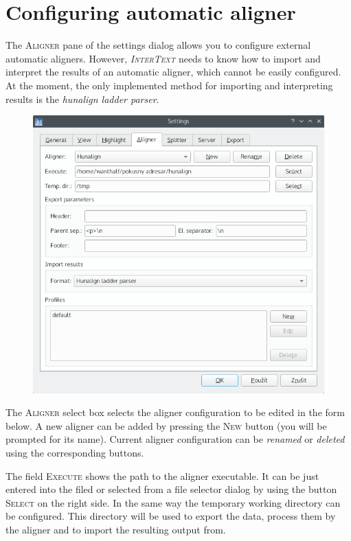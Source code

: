\documentclass[a4paper,10pt,oneside]{book}
\newcommand{\IT}{\textit{\textsc{InterText}}\xspace}
\newcommand{\menu}[1]{\textsc{#1}}
\begin{document}
\newpage
\section{Configuring automatic aligner}\label{ch:detail:config:aligner}

The \menu{Aligner} pane of the settings dialog allows you to configure external automatic aligners. However, \IT needs to know how to import and interpret the results of an automatic aligner, which cannot be easily configured. At the moment, the only implemented method for importing and interpreting results is the \emph{hunalign ladder parser}.

\begin{figure}[htbf]
 \includegraphics[width=\textwidth]{screenshots/settings_aligner.png}
\end{figure}

The \menu{Aligner} select box selects the aligner configuration to be edited in the form below. A new aligner can be added by pressing the \menu{New} button (you will be prompted for its name). Current aligner configuration can be \emph{renamed} or \emph{deleted} using the corresponding buttons.

The field \menu{Execute} shows the path to the aligner executable. It can be just entered into the filed or selected from a file selector dialog by using the button \menu{Select} on the right side. In the same way the temporary working directory can be configured. This directory will be used to export the data, process them by the aligner and to import the resulting output from.
\end{document}
